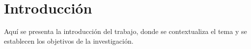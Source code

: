 \chapter*{Introducción}

Aquí se presenta la introducción del trabajo, donde se contextualiza el tema y se establecen los objetivos de la investigación.